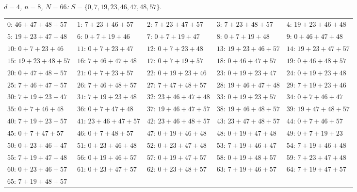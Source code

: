 \emph{$d = 4$, $n = 8$, $N = 66$:} $S = \{0, 7, 19, 23, 46, 47, 48, 57\}$.
\begin{center}\scriptsize
\begin{tabular}{lllll}
$0$: $46+47+48+57$ & $1$: $7+23+46+57$ & $2$: $7+23+47+57$ & $3$: $7+23+48+57$ & $4$: $19+23+46+48$\\
$5$: $19+23+47+48$ & $6$: $0+7+19+46$ & $7$: $0+7+19+47$ & $8$: $0+7+19+48$ & $9$: $0+46+47+48$\\
$10$: $0+7+23+46$ & $11$: $0+7+23+47$ & $12$: $0+7+23+48$ & $13$: $19+23+46+57$ & $14$: $19+23+47+57$\\
$15$: $19+23+48+57$ & $16$: $7+46+47+48$ & $17$: $0+7+19+57$ & $18$: $0+46+47+57$ & $19$: $0+46+48+57$\\
$20$: $0+47+48+57$ & $21$: $0+7+23+57$ & $22$: $0+19+23+46$ & $23$: $0+19+23+47$ & $24$: $0+19+23+48$\\
$25$: $7+46+47+57$ & $26$: $7+46+48+57$ & $27$: $7+47+48+57$ & $28$: $19+46+47+48$ & $29$: $7+19+23+46$\\
$30$: $7+19+23+47$ & $31$: $7+19+23+48$ & $32$: $23+46+47+48$ & $33$: $0+19+23+57$ & $34$: $0+7+46+47$\\
$35$: $0+7+46+48$ & $36$: $0+7+47+48$ & $37$: $19+46+47+57$ & $38$: $19+46+48+57$ & $39$: $19+47+48+57$\\
$40$: $7+19+23+57$ & $41$: $23+46+47+57$ & $42$: $23+46+48+57$ & $43$: $23+47+48+57$ & $44$: $0+7+46+57$\\
$45$: $0+7+47+57$ & $46$: $0+7+48+57$ & $47$: $0+19+46+48$ & $48$: $0+19+47+48$ & $49$: $0+7+19+23$\\
$50$: $0+23+46+47$ & $51$: $0+23+46+48$ & $52$: $0+23+47+48$ & $53$: $7+19+46+47$ & $54$: $7+19+46+48$\\
$55$: $7+19+47+48$ & $56$: $0+19+46+57$ & $57$: $0+19+47+57$ & $58$: $0+19+48+57$ & $59$: $7+23+47+48$\\
$60$: $0+23+46+57$ & $61$: $0+23+47+57$ & $62$: $0+23+48+57$ & $63$: $7+19+46+57$ & $64$: $7+19+47+57$\\
$65$: $7+19+48+57$ &  &  &  & 
\end{tabular}
\end{center}

